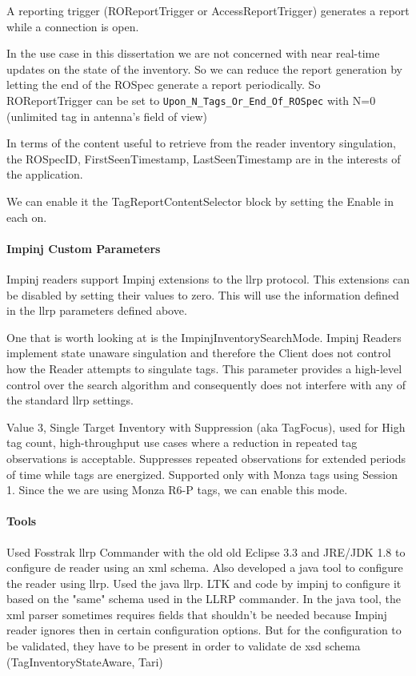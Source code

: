 A reporting trigger (ROReportTrigger or AccessReportTrigger) generates a report while a connection is open.

In the use case in this dissertation we are not concerned with near real-time updates on the state of the inventory. So we can reduce the report generation by letting the end of the ROSpec generate a report periodically.
So ROReportTrigger can be set to \texttt{Upon\_N\_Tags\_Or\_End\_Of\_ROSpec} with N=0 (unlimited tag in antenna's field of view)~\cite[sec. 14.2.1]{LowLevelReader}

In terms of the content useful to retrieve from the reader inventory singulation, the ROSpecID, FirstSeenTimestamp, LastSeenTimestamp are in the interests of the application.

We can enable it the TagReportContentSelector block by setting the Enable in each on.

\paragraph{Impinj Custom Parameters}

Impinj readers support Impinj extensions to the \ac{llrp} protocol. This extensions can be disabled by setting their values to zero. This will use the information defined in the \ac{llrp} parameters defined above.

One that is worth looking at is the ImpinjInventorySearchMode.
Impinj Readers implement state unaware singulation and therefore the Client does not control how the Reader attempts to singulate tags. This parameter provides a high-level control over the search algorithm and consequently does not interfere with any of the standard \ac{llrp} settings.~\cite[sec. 4.3.3]{ImpinjOctaneLLRP}

Value 3, Single Target Inventory with Suppression (aka TagFocus), used for High tag count, high-throughput use cases where a reduction in repeated tag observations is acceptable. Suppresses repeated observations for extended periods of time while tags are energized. Supported only with Monza tags using Session 1. Since the we are using Monza R6-P tags, we can enable this mode.

\paragraph{Tools}

Used Fosstrak \ac{llrp} Commander with the old old Eclipse 3.3 and JRE/JDK 1.8 to configure de reader using an xml schema.
Also developed a java tool to configure the reader using \ac{llrp}. Used the java llrp. LTK and code by impinj to configure it based on the "same" schema used in the LLRP commander.
In the java tool, the xml parser sometimes requires fields that shouldn't be needed because Impinj reader ignores then in certain configuration options. But for the configuration to be validated, they have to be present in order to validate de xsd schema (TagInventoryStateAware, Tari)

